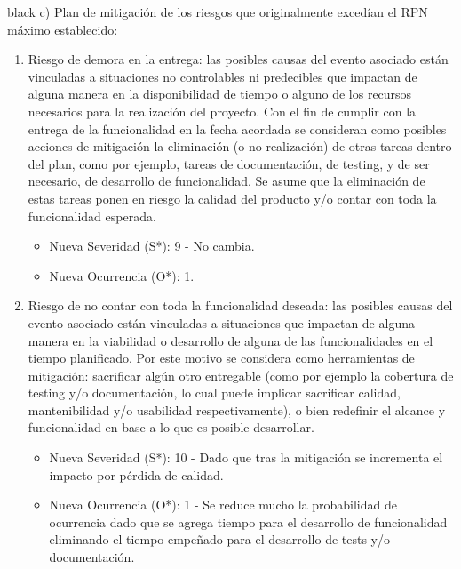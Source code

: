 \documentclass[
11pt, %
]{charter}
\begin{document}
\begin{consigna}{black}
c) Plan de mitigación de los riesgos que originalmente excedían el RPN máximo establecido:
\begin{enumerate}
	\item Riesgo de demora en la entrega: las posibles causas del evento asociado están vinculadas a situaciones no controlables ni predecibles que impactan de alguna manera en la disponibilidad de tiempo o alguno de los recursos necesarios para la realización del proyecto. Con el fin de cumplir con la entrega de la funcionalidad en la fecha acordada se consideran como posibles acciones de mitigación la eliminación (o no realización) de otras tareas dentro del plan, como por ejemplo, tareas de documentación, de testing, y de ser necesario, de desarrollo de funcionalidad. Se asume que la eliminación de estas tareas ponen en riesgo la calidad del producto y/o contar con toda la funcionalidad esperada.
	\begin{itemize}
		\item Nueva Severidad (S*): 9 - No cambia.
		\item Nueva Ocurrencia (O*): 1.
	\end{itemize}
	
	\item Riesgo de no contar con toda la funcionalidad deseada: las posibles causas del evento asociado están vinculadas a situaciones que impactan de alguna manera en la viabilidad o desarrollo de alguna de las funcionalidades en el tiempo planificado. Por este motivo se considera como herramientas de mitigación: sacrificar algún otro entregable (como por ejemplo la cobertura de testing y/o documentación, lo cual puede implicar sacrificar calidad, mantenibilidad y/o usabilidad respectivamente), o bien redefinir el alcance y funcionalidad en base a lo que es posible desarrollar.
	\begin{itemize}
		\item Nueva Severidad (S*): 10 - Dado que tras la mitigación se incrementa el impacto por pérdida de calidad.
		\item Nueva Ocurrencia (O*): 1 - Se reduce mucho la probabilidad de ocurrencia dado que se agrega tiempo para el desarrollo de funcionalidad eliminando el tiempo empeñado para el desarrollo de tests y/o documentación.
	\end{itemize}
	

\end{enumerate}
\end{consigna}
\end{document}
